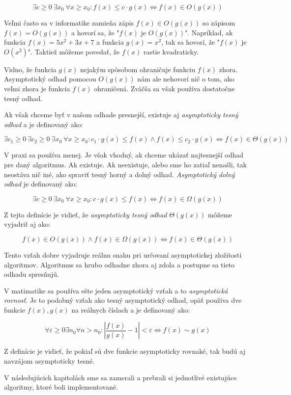 $$\exists c\ge 0\ \exists x_0\ \forall x\ge x_0: 
f(x) \leq c\cdot g(x) \iff f(x) \in O(g(x))$$

Veľmi často sa v informatike zamieňa zápis $f(x) \in O(g(x))$ so zápisom 
$f(x) = O(g(x))$ a hovorí sa, že "$f(x)$ je $O(g(x))$". Napríklad, ak 
funkcia $f(x) = 5x^2+3x+7$ a funkcia $g(x) = x^2$, tak sa hovorí, 
že "$f(x)$ je $O(x^2)$". Taktiež môžeme povedať, že $f(x)$ rastie 
kvadraticky.

Vidno, že funkcia $g(x)$ nejakým spôsobom ohraničuje funkciu $f(x)$ zhora. 
Asymptotický odhad pomocou $O(g(x))$ nám ale nehovorí nič o tom, ako veľmi 
zhora je funkcia $f(x)$ ohraničená. Zväčša sa však používa dostatočne tesný 
odhad.

Ak však chceme byť v našom odhade presnejší, existuje aj \emph{asymptoticky tesný 
odhad} a je definovaný ako:

$$\exists c_1\ge 0\ \exists c_2\ge 0\ \exists x_0\ \forall x\ge x_0: 
c_1\cdot g(x)\leq f(x) \wedge f(x) \leq c_2\cdot g(x) \iff f(x) \in \Theta (g(x))$$

V praxi sa používa menej. Je však vhodný, ak chceme ukázať najtesnejší odhad 
pre daný algoritmus. Ak existuje. Ak neexistuje, alebo sme ho zatiaľ nenašli, 
tak neostáva nič iné, ako spraviť tesný horný a dolný odhad. 
\emph{Asymptotický dolný odhad} je 
definovaný ako:

$$\exists c\ge 0\ \exists x_0\ \forall x\ge x_0: 
c\cdot g(x) \leq f(x) \iff f(x) \in \Omega (g(x))$$

Z tejto definície je vidieť, že \emph{asymptoticky tesný odhad} $\Theta (g(x))$ 
môžeme vyjadriť aj ako: 

$$f(x) \in O(g(x)) \wedge f(x) \in \Omega (g(x)) \iff f(x) \in \Theta (g(x))$$

Tento vzťah dobre vyjadruje reálnu snahu pri určovaní asymptotickej zložitosti 
algoritmov. Algoritmus sa hrubo odhadne zhora aj zdola a postupne sa tieto 
odhadu spresňujú. 

V matimatike sa používa ešte jeden asymptotický vzťah a to 
\emph{asymptotická rovnosť}. Je to podobný vzťah ako tesný asymptotický odhad, 
opäť používa dve funkcie $f(x), g(x)$ na reálnych číslach a je definovaný ako:

$$\forall \varepsilon \ge 0 \exists n_0 \forall n > n_0: 
\left| \frac{f(x)}{g(x)} - 1 \right| < \varepsilon \iff f(x) \sim g(x)$$

Z definície je vidieť, že pokiaľ sú dve funkcie asymptoticky rovnaké, tak budú 
aj navzájom asymptoticky tesné.

V následujúcich kapitolách sme sa zamerali a prebrali si jednotlivé existujúce 
algoritmy, ktoré boli implementované.
